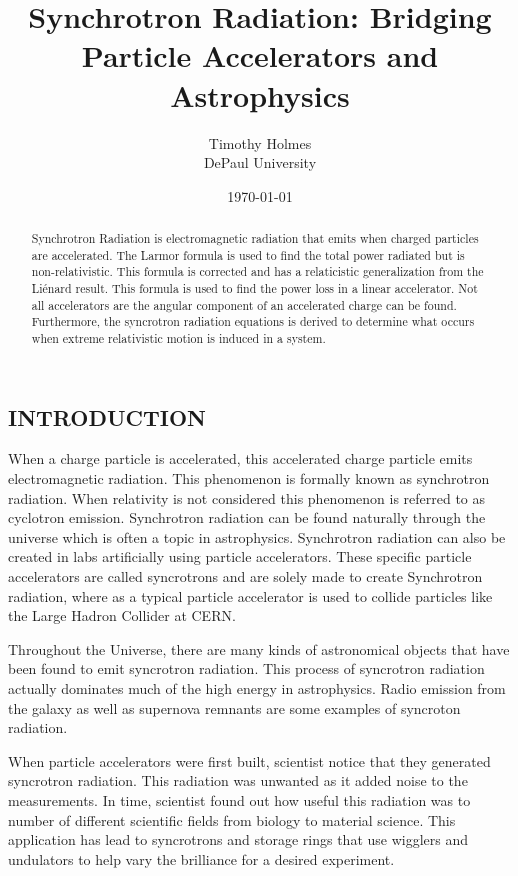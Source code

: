 \documentclass[a4paper]{article}
\title{Synchrotron Radiation: Bridging Particle Accelerators and Astrophysics}
\author{Timothy Holmes \\ 
        DePaul University}
\date{\today}
\begin{document}
\maketitle


\begin{abstract}
Synchrotron Radiation is electromagnetic radiation that emits when charged particles are accelerated. The Larmor formula is used to find the total power radiated but is non-relativistic. This formula is corrected and has a relaticistic generalization from the Liénard result. This formula is used to find the power loss in a linear accelerator. Not all accelerators are the angular component of an accelerated charge can be found. Furthermore, the syncrotron radiation equations is derived to determine what occurs when extreme relativistic motion is induced in a system. 
\end{abstract}

\begin{center}
\section{INTRODUCTION}
\end{center}

When a charge particle is accelerated, this accelerated charge particle emits electromagnetic radiation. This phenomenon is formally known as synchrotron radiation. When relativity is not considered this phenomenon is referred to as cyclotron emission. Synchrotron radiation can be found naturally through the universe which is often a topic in astrophysics. Synchrotron radiation can also be created in labs artificially using particle accelerators. These specific particle accelerators are called syncrotrons and are solely made to create Synchrotron radiation, where as a typical particle accelerator is used to collide particles like the Large Hadron Collider at CERN.  

Throughout the Universe, there are many kinds of astronomical objects that have been found to emit syncrotron radiation. This process of syncrotron radiation actually dominates much of the high energy in astrophysics. Radio emission from the galaxy as well as supernova remnants are some examples of syncroton radiation. 

When particle accelerators were first built, scientist notice that they generated syncrotron radiation. This radiation was unwanted as it added noise to the measurements. In time, scientist found out how useful this radiation was to number of different scientific fields from biology to material science. This application has lead to syncrotrons and storage rings that use wigglers and undulators to help vary the brilliance for a desired experiment. 
\end{document}

